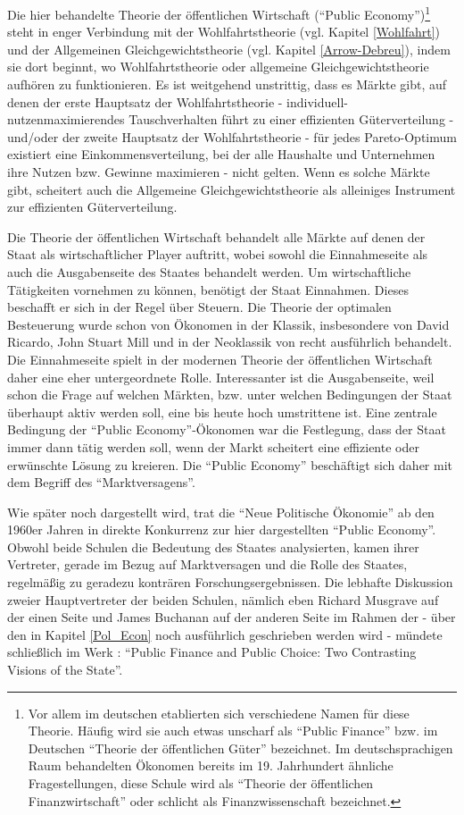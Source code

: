 Die hier behandelte Theorie der öffentlichen Wirtschaft ("`Public Economy"')\footnote{Vor allem im deutschen etablierten sich verschiedene Namen für diese Theorie. Häufig wird sie auch etwas unscharf als "`Public Finance"' bzw. im Deutschen "`Theorie der öffentlichen Güter"' bezeichnet. Im deutschsprachigen Raum behandelten Ökonomen bereits im 19. Jahrhundert ähnliche Fragestellungen, diese Schule wird als "`Theorie der öffentlichen Finanzwirtschaft"' oder schlicht als Finanzwissenschaft bezeichnet.} steht in enger Verbindung mit der Wohlfahrtstheorie (vgl. Kapitel \ref{Wohlfahrt}) und der Allgemeinen Gleichgewichtstheorie (vgl. Kapitel \ref{Arrow-Debreu}), indem sie dort beginnt, wo Wohlfahrtstheorie oder allgemeine Gleichgewichtstheorie aufhören zu funktionieren. Es ist weitgehend unstrittig, dass es Märkte gibt, auf denen der erste Hauptsatz der Wohlfahrtstheorie - individuell-nutzenmaximierendes Tauschverhalten führt zu einer effizienten Güterverteilung - und/oder der zweite Hauptsatz der Wohlfahrtstheorie - für jedes Pareto-Optimum existiert eine Einkommensverteilung, bei der alle Haushalte und Unternehmen ihre Nutzen bzw. Gewinne maximieren - nicht gelten. Wenn es solche Märkte gibt, scheitert auch die Allgemeine Gleichgewichtstheorie als alleiniges Instrument zur effizienten Güterverteilung.

Die Theorie der öffentlichen Wirtschaft behandelt alle Märkte auf denen der Staat als wirtschaftlicher Player auftritt, wobei sowohl die Einnahmeseite als auch die Ausgabenseite des Staates behandelt werden. Um wirtschaftliche Tätigkeiten vornehmen zu können, benötigt der Staat Einnahmen. Dieses beschafft er sich in der Regel über Steuern. Die Theorie der optimalen Besteuerung wurde schon von Ökonomen in der Klassik, insbesondere von David Ricardo, John Stuart Mill und in der Neoklassik von \textcite[Kapitel 38]{Walras1874} recht ausführlich behandelt. Die Einnahmeseite spielt in der modernen Theorie der öffentlichen Wirtschaft daher eine eher untergeordnete Rolle. Interessanter ist die Ausgabenseite, weil schon die Frage auf welchen Märkten, bzw. unter welchen Bedingungen der Staat überhaupt aktiv werden soll, eine bis heute hoch umstrittene ist. Eine zentrale Bedingung der "`Public Economy"'-Ökonomen war die Festlegung, dass der Staat immer dann tätig werden soll, wenn der Markt scheitert eine effiziente oder erwünschte Lösung zu kreieren. Die "`Public Economy"' beschäftigt sich daher mit dem Begriff des "`Marktversagens"'.

Wie später noch dargestellt wird, trat die "`Neue Politische Ökonomie"' ab den 1960er Jahren in direkte Konkurrenz zur hier dargestellten "`Public Economy"'. Obwohl beide Schulen die Bedeutung des Staates analysierten, kamen ihrer Vertreter, gerade im Bezug auf Marktversagen und die Rolle des Staates, regelmäßig zu geradezu konträren Forschungsergebnissen. Die lebhafte Diskussion zweier Hauptvertreter der beiden Schulen, nämlich eben Richard Musgrave auf der einen Seite und James Buchanan auf der anderen Seite im Rahmen der - über den in Kapitel \ref{Pol_Econ} noch ausführlich geschrieben werden wird - mündete schließlich im Werk \textcite{Musgrave1999}: "`Public Finance and Public Choice: Two Contrasting Visions of the State"'.

